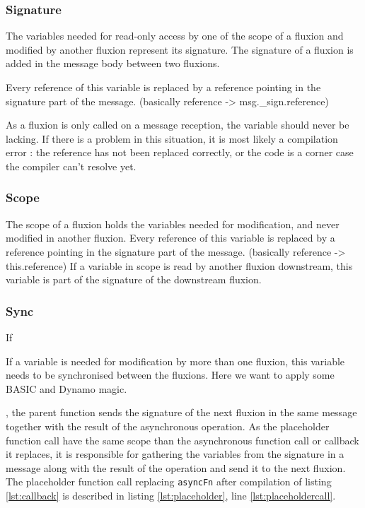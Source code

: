\subsubsection{Signature}

  The variables needed for read-only access by one of the scope of a fluxion and modified by another fluxion represent its signature.
  The signature of a fluxion is added in the message body between two fluxions.

  Every reference of this variable is replaced by a reference pointing in the signature part of the message.
  (basically reference -> msg._sign.reference)

  As a fluxion is only called on a message reception, the variable should never be lacking.
  If there is a problem in this situation, it is most likely a compilation error : the reference has not been replaced correctly, or the code is a corner case the compiler can't resolve yet.

\subsubsection{Scope}

  The scope of a fluxion holds the variables needed for modification, and never modified in another fluxion.
  Every reference of this variable is replaced by a reference pointing in the signature part of the message.
  (basically reference -> this.reference)
  If a variable in scope is read by another fluxion downstream, this variable is part of the signature of the downstream fluxion.

\subsubsection{Sync}

  If 

  If a variable is needed for modification by more than one fluxion, this variable needs to be synchronised between the fluxions.
  Here we want to apply some BASIC and Dynamo magic.



, the parent function sends the signature of the next fluxion in the same message together with the result of the asynchronous operation.
As the placeholder function call have the same scope than the asynchronous function call or callback it replaces, it is responsible for gathering the variables from the signature in a message along with the result of the operation and send it to the next fluxion.
The placeholder function call replacing \texttt{asyncFn} after compilation of listing \ref{lst:callback} is described in listing \ref{lst:placeholder}, line \ref{lst:placeholdercall}.

